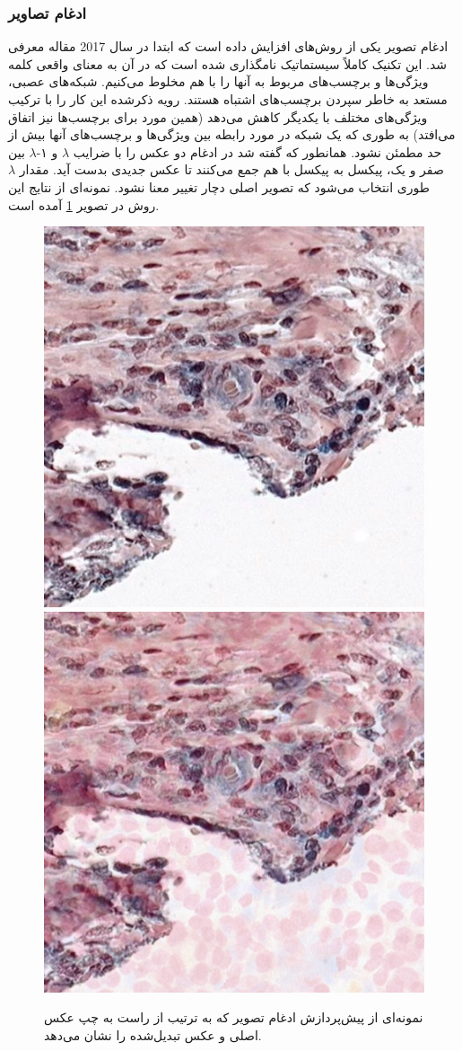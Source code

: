 \subsubsection{ادغام تصاویر}
ادغام تصویر یکی از روش‌های افزایش داده است که ابتدا در سال 2017 مقاله
\cite{zhang2017mixup}
معرفی شد.
این تکنیک کاملاً سیستماتیک نامگذاری شده است که در آن به معنای واقعی کلمه ویژگی‌ها و برچسب‌های مربوط به آنها را با هم مخلوط می‌کنیم. شبکه‌های عصبی، مستعد به خاطر سپردن برچسب‌های اشتباه هستند. رویه ذکر‌شده این کار را با ترکیب ویژگی‌های مختلف با یکدیگر کاهش می‌دهد (همین مورد برای برچسب‌ها نیز اتفاق می‌افتد) به طوری که یک شبکه در مورد رابطه بین ویژگی‌ها و برچسب‌های آنها بیش از حد مطمئن نشود.
همانطور که گفته شد در ادغام دو عکس را با ضرایب $\lambda$ و ۱-$\lambda$ بین صفر و یک، پیکسل به پیکسل با هم جمع می‌کنند تا عکس جدیدی بدست آید. مقدار $\lambda$ طوری انتخاب می‌شود که تصویر اصلی دچار تغییر معنا نشود.
نمونه‌ای از نتایج این روش در تصویر \ref{mixup augmentation} آمده است.
\begin{figure}
    \begin{center}
        \includegraphics[width=0.48\linewidth]{figs/suggested_methods/subs/data_augmentation/mixup_776-original.jpeg}
        \includegraphics[width=0.48\linewidth]{figs/suggested_methods/subs/data_augmentation/mixup_776-transformed.jpeg}
    \end{center}
    \caption{نمونه‌ای از پیش‌پردازش ادغام تصویر که به ترتیب از راست به چپ عکس اصلی و عکس تبدیل‌شده را نشان می‌دهد.}
    \label{mixup augmentation}
\end{figure}
